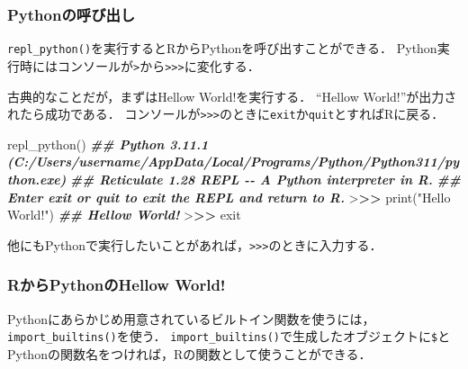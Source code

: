 \documentclass[
]{article}
\newenvironment{Shaded}{\begin{snugshade}}{\end{snugshade}}
\newcommand{\DocumentationTok}[1]{\textcolor[rgb]{0.56,0.35,0.01}{\textbf{\textit{#1}}}}
\newcommand{\ErrorTok}[1]{\textcolor[rgb]{0.64,0.00,0.00}{\textbf{#1}}}
\newcommand{\FunctionTok}[1]{\textcolor[rgb]{0.00,0.00,0.00}{#1}}
\newcommand{\NormalTok}[1]{#1}
\newcommand{\OtherTok}[1]{\textcolor[rgb]{0.56,0.35,0.01}{#1}}
\newcommand{\SpecialCharTok}[1]{\textcolor[rgb]{0.00,0.00,0.00}{#1}}
\newcommand{\StringTok}[1]{\textcolor[rgb]{0.31,0.60,0.02}{#1}}
\begin{document}
\hypertarget{pythonux306eux547cux3073ux51faux3057}{%
\subsubsection{Pythonの呼び出し}\label{pythonux306eux547cux3073ux51faux3057}}

\texttt{repl\_python()}を実行するとRからPythonを呼び出すことができる．
Python実行時にはコンソールが\texttt{\textgreater{}}から\texttt{\textgreater{}\textgreater{}\textgreater{}}に変化する．

古典的なことだが，まずはHellow World!を実行する．
``Hellow World!''が出力されたら成功である．
コンソールが\texttt{\textgreater{}\textgreater{}\textgreater{}}のときに\texttt{exit}か\texttt{quit}とすればRに戻る．

\begin{Shaded}
\begin{Highlighting}[]
\FunctionTok{repl\_python}\NormalTok{()}
\DocumentationTok{\#\# Python 3.11.1 (C:/Users/username/AppData/Local/Programs/Python/Python311/python.exe)}
\DocumentationTok{\#\# Reticulate 1.28 REPL {-}{-} A Python interpreter in R.}
\DocumentationTok{\#\# Enter \textquotesingle{}exit\textquotesingle{} or \textquotesingle{}quit\textquotesingle{} to exit the REPL and return to R.}
\SpecialCharTok{\textgreater{}}\ErrorTok{\textgreater{}\textgreater{}} \FunctionTok{print}\NormalTok{(}\StringTok{"Hello World!"}\NormalTok{)}
\DocumentationTok{\#\# Hellow World!}
\SpecialCharTok{\textgreater{}}\ErrorTok{\textgreater{}\textgreater{}}\NormalTok{ exit}
\end{Highlighting}
\end{Shaded}

他にもPythonで実行したいことがあれば，\texttt{\textgreater{}\textgreater{}\textgreater{}}のときに入力する．

\hypertarget{rux304bux3089pythonux306ehellow-world}{%
\subsubsection{RからPythonのHellow World!}\label{rux304bux3089pythonux306ehellow-world}}

Pythonにあらかじめ用意されているビルトイン関数を使うには，\texttt{import\_builtins()}を使う．
\texttt{import\_builtins()}で生成したオブジェクトに\texttt{\$}とPythonの関数名をつければ，Rの関数として使うことができる．

\begin{Shaded}
\end{Shaded}
\end{document}
